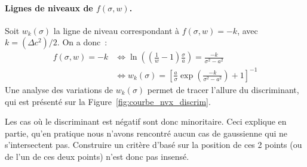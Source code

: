\documentclass[main.tex]{subfiles}
\begin{document}
\paragraph{Lignes de niveaux de $f( \sigma,w )$.}
Soit $w_k(\sigma)$ la ligne de niveau correspondant à $f(\sigma,w)=-k$, avec $k= (\Delta c ^2) /2$. On a donc~:
\begin{align*}
f(\sigma,w)=-k & \Leftrightarrow \ln\left( \left( \frac{1}{w}-1 \right) \frac{\sigma}{a}  \right) = \frac{-k}{\sigma^2-a^2} \\
& \Leftrightarrow w_k(\sigma) = \left[ \frac{a}{\sigma} \exp \left( \frac{-k}{\sigma^2-a^2} \right) +1\right]^{-1}
\end{align*}
Une analyse des variations de $w_k(\sigma)$ permet de tracer l'allure du discriminant, qui est présenté sur la Figure~\ref{fig:courbe_nvx_discrim}.


Les cas où le discriminant est négatif sont donc minoritaire. Ceci explique en partie, qu'en pratique nous n'avons rencontré aucun cas de gaussienne qui ne s'intersectent pas. Construire un critère d'\hetero basé sur la position de ces 2 points (ou de l'un de ces deux points) n'est donc pas insensé.
\end{document}
